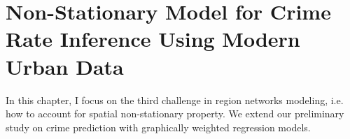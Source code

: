 \chapter{Non-Stationary Model for Crime Rate Inference Using Modern Urban Data}
\label{ch:non-stationary}

In this chapter, I focus on the third challenge in region networks modeling, i.e. how to account for spatial non-stationary property. We extend our preliminary study on crime prediction with graphically weighted regression models.

